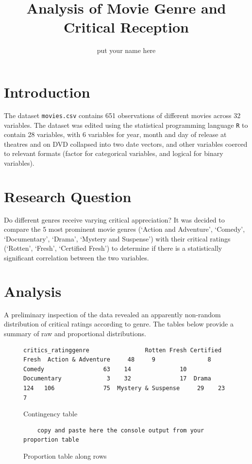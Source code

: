 \documentclass[12pt,a4paper]{article}
\author{put your name here}
\title{Analysis of Movie Genre and Critical Reception}
\begin{document}
	\maketitle
	
	\section*{Introduction}
	The dataset {\tt movies.csv} contains 651 observations of different movies across 32 variables. The dataset was edited using the statistical programming language {\tt R} to contain 28 variables, with 6 variables for year, month and day of release at theatres and on DVD collapsed into two date vectors, and other variables coerced to relevant formats (factor for categorical variables, and logical for binary variables). 
	
	\section*{Research Question}
	Do different genres receive varying critical appreciation? It was decided to compare the 5 most prominent movie genres (`Action and Adventure', `Comedy', `Documentary', `Drama', `Mystery and Suspense') with their critical ratings (`Rotten', `Fresh', `Certified Fresh') to determine if there is a statistically significant correlation between the two variables.
	
	\section*{Analysis}
	A preliminary inspection of the data revealed an apparently non-random distribution of critical ratings according to genre. The tables below provide a summary of raw and proportional distributions.
	\begin{figure}
			\begin{verbatim}
critics_ratinggenre                Rotten Fresh Certified Fresh  Action & Adventure     48     9               8  Comedy                 63    14              10  Documentary             3    32              17  Drama                 124   106              75  Mystery & Suspense     29    23               7
			\end{verbatim}
		\caption{\footnotesize Contingency table}
	\end{figure}
	\begin{figure}
			\begin{verbatim}
	copy and paste here the console output from your proportion table
			\end{verbatim}
		\caption{\footnotesize Proportion table along rows}
	\end{figure}
\end{document}
